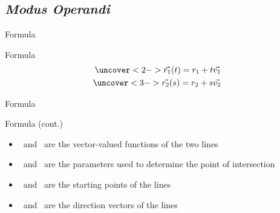 \subsection{\textit{Modus Operandi}}
\frame{\subsectionpage}
\begin{frame}{Formula}
    \begin{block}{Formula}
            \begin{align*}
                \uncover<2->{\vec{r_1}(t) = r_1 + t\vec{v_1}} \\
                \uncover<3->{\vec{r_2}(s) = r_2 + s\vec{v_2}}
            \end{align*}
    \end{block}
\end{frame}
\begin{frame}{Formula}
    \begin{block}{Formula (cont.)}
        \begin{itemize}
            \item<2->{\begingroup{}\endgroup \ and \begingroup{}\endgroup \ are the vector-valued functions of the two lines}
            \item<3->{\begingroup{}\endgroup \ and \begingroup{}\endgroup \ are the parameters used to determine the point of intersection}
            \item<4->{\begingroup{}\endgroup \ and \begingroup{}\endgroup \ are the starting points of the lines}
            \item<5>{\begingroup{}\endgroup \ and \begingroup{}\endgroup \ are the direction vectors of the lines}
        \end{itemize}
    \end{block}
\end{frame}
